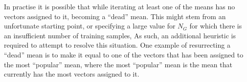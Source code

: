In practise it is possible that while iterating at least one of the means has no vectors assigned to it,
becoming a ``dead'' mean.
This might stem from an unfortunate starting point, 
or specifying a large value for $N_G$ for which there is an insufficient number of training samples,
As such, an additional heuristic is required to attempt to resolve this situation.
One example of resurrecting a ``dead'' mean is to make it equal to one of the vectors
that has been assigned to the most ``popular'' mean,
where the most ``popular'' mean is the mean that currently has the most vectors assigned to it.

